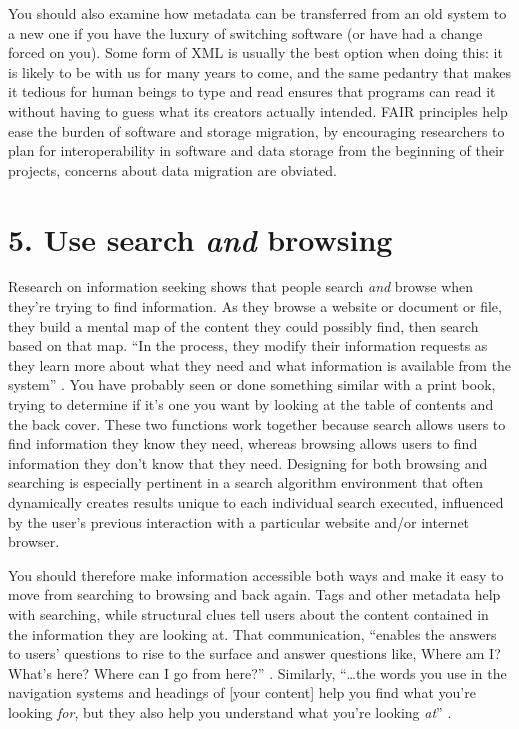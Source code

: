 \documentclass[10pt,letterpaper]{article}
\newcommand{\rulemajor}[1]{\section*{#1}}
\begin{document}
You should also examine how metadata can be transferred from an old system to a
new one if you have the luxury of switching software (or have had a change
forced on you). Some form of XML is usually the best option when doing this: it
is likely to be with us for many years to come, and the same pedantry that makes
it tedious for human beings to type and read ensures that programs can read it
without having to guess what its creators actually intended.
FAIR principles help ease the burden of software and storage migration, by encouraging researchers to plan for interoperability in software and data storage from the beginning of their projects, concerns about data migration are obviated.

\rulemajor{5. Use search \emph{and} browsing}

Research on information seeking shows that people search \emph{and} browse when
they're trying to find information. As they browse a website or document or
file, they build a mental map of the content they could possibly find, then
search based on that map. ``In the process, they modify their information
requests as they learn more about what they need and what information is
available from the system'' \cite{Rosenfeld2015}. You have probably seen or done
something similar with a print book, trying to determine if it's one you want by
looking at the table of contents and the back cover. These two functions work
together because search allows users to find information they know they need,
whereas browsing allows users to find information they don't know that they 
need\cite{Bates2002}. Designing for both browsing and searching is especially 
pertinent in a search algorithm environment that often dynamically creates 
results unique to each individual search executed, influenced by the user's 
previous interaction with a particular website and/or internet browser.

You should therefore make information accessible both ways and make it easy to
move from searching to browsing and back again. Tags and other metadata help
with searching, while structural clues tell users about the content contained in
the information they are looking at. That communication, ``enables the answers
to users' questions to rise to the surface and answer questions like, Where am
I? What's here? Where can I go from here?''  \cite{Rosenfeld2015}. Similarly,
``{\ldots}the words you use in the navigation systems and headings of [your
  content] help you find what you're looking \emph{for}, but they also help you
understand what you're looking \emph{at}'' \cite{Arango2018}.
\end{document}
